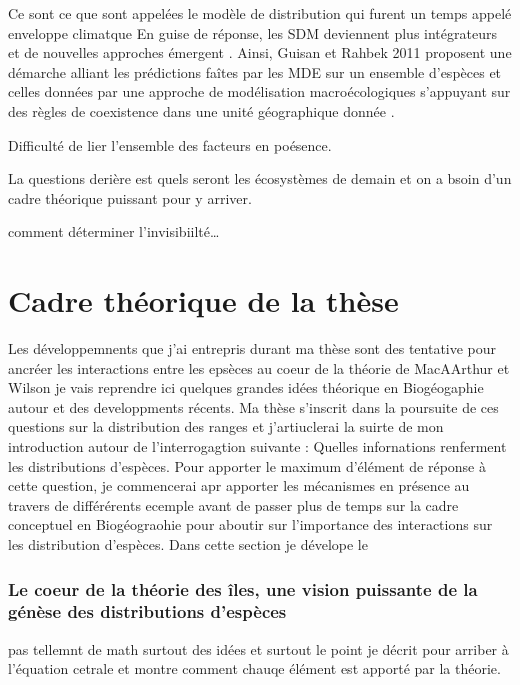Ce sont ce que sont appelées le modèle de distribution qui furent un
temps appelé enveloppe climatque En guise de réponse, les SDM deviennent
plus intégrateurs et de nouvelles approches émergent
\cite{Kissling2011}. Ainsi, Guisan et Rahbek 2011 proposent une démarche
alliant les prédictions faîtes par les MDE sur un ensemble d'espèces et
celles données par une approche de modélisation macroécologiques
s'appuyant sur des règles de coexistence dans une unité géographique
donnée \cite{Guisan2011}.

Difficulté de lier l'ensemble des facteurs en poésence.

La questions derière est quels seront les écosystèmes de demain et on a
bsoin d'un cadre théorique puissant pour y arriver.

comment déterminer l'invisibiilté\ldots{}

\section*{Cadre théorique de la
thèse}\label{cadre-thuxe9orique-de-la-thuxe8se}

Les développemnents que j'ai entrepris durant ma thèse sont des
tentative pour ancréer les interactions entre les epsèces au coeur de la
théorie de MacAArthur et Wilson je vais reprendre ici quelques grandes
idées théorique en Biogéogaphie autour et des developpments récents. Ma
thèse s'inscrit dans la poursuite de ces questions sur la distribution
des ranges et j'artiuclerai la suirte de mon introduction autour de
l'interrogagtion suivante : Quelles infornations renferment les
distributions d'espèces. Pour apporter le maximum d'élément de réponse à
cette question, je commencerai apr apporter les mécanismes en présence
au travers de différérents ecemple avant de passer plus de temps sur la
cadre conceptuel en Biogéograohie pour aboutir sur l'importance des
interactions sur les distribution d'espèces. Dans cette section je
dévelope le

\subsubsection{Le coeur de la théorie des îles, une vision puissante de
la génèse des distributions
d'espèces}\label{le-coeur-de-la-thuxe9orie-des-uxeeles-une-vision-puissante-de-la-guxe9nuxe8se-des-distributions-despuxe8ces}

pas tellemnt de math surtout des idées et surtout le point je décrit
pour arriber à l'équation cetrale et montre comment chauqe élément est
apporté par la théorie.

